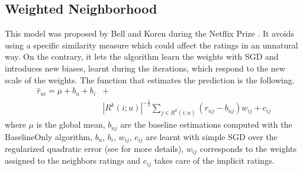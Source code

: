 \documentclass[10pt,conference,compsocconf]{IEEEtran}
\begin{document}
\subsection{Weighted Neighborhood}
This model was proposed by Bell and Koren during the Netflix Prize \cite{koren2008factorization, koren2010factor}. It avoids using a specific similarity measure which could affect the ratings in an unnatural way. On the contrary, it lets the algorithm learn the weights with SGD and introduces new biases, learnt during the iterations, which respond to the new scale of the weights. The function that estimates the prediction is the following.
\begin{align}
\hat{r}_{ui} = \mu + b_{u} + b_{i} &+ \nonumber\\
&|R^{k}(i;u)|^{-\frac{1}{2}} \sum_{j \in R^{k}(i;u) }(r_{uj}-b_{uj})w_{ij} + c_{ij}  
\end{align}
where $\mu$ is the global mean, $b_{uj}$ are the baseline estimations computed with the BaselineOnly algorithm, $b_{u}$, $b_{i}$, $w_{ij}$, $c_{ij}$ are learnt with simple SGD over the regularized quadratic error (see \cite{koren2008factorization,koren2010factor} for more details), $w_{ij}$ corresponds to the weights assigned to the neighbors ratings and $c_{ij}$ takes care of the implicit ratings.
\end{document}
